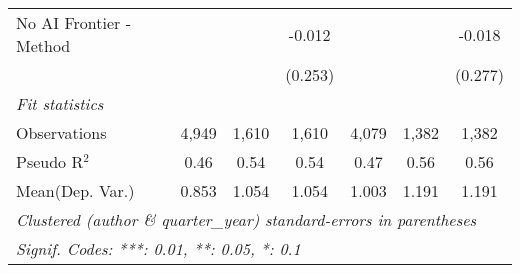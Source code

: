 \begin{tabular}{lcccccc}
   No AI Frontier - Method &              &             & -0.012      &               &         & -0.018\\   
                           &              &             & (0.253)     &               &         & (0.277)\\   
   \midrule
   \emph{Fit statistics}\\
   Observations            & 4,949        & 1,610       & 1,610       & 4,079         & 1,382   & 1,382\\  
   Pseudo R$^2$            & 0.46         & 0.54        & 0.54        & 0.47          & 0.56    & 0.56\\  
Mean(Dep. Var.) & 0.853 & 1.054 & 1.054 & 1.003 & 1.191 & 1.191 \\
   \midrule \midrule
   \multicolumn{7}{l}{\emph{Clustered (author \& quarter\_year) standard-errors in parentheses}}\\
   \multicolumn{7}{l}{\emph{Signif. Codes: ***: 0.01, **: 0.05, *: 0.1}}\\
\end{tabular}
\par\endgroup
